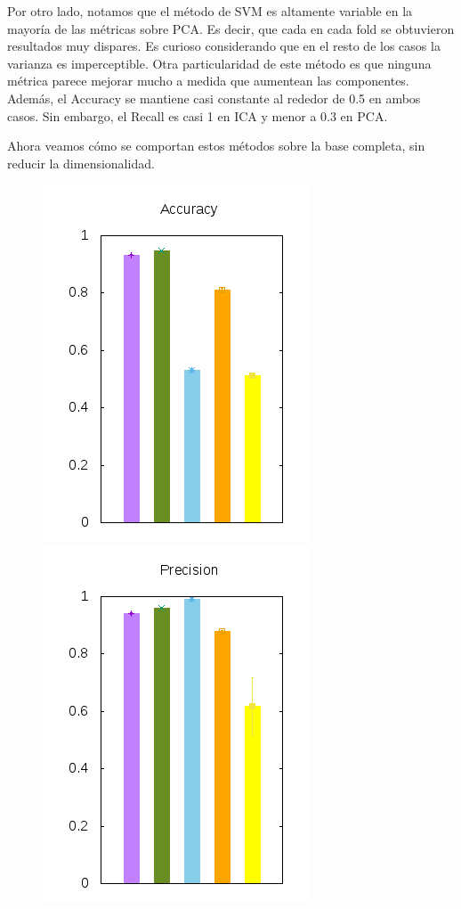 \documentclass[10pt, a4paper]{article}
\begin{document}
Por otro lado, notamos que el método de SVM es altamente variable en la mayoría de las métricas sobre PCA. Es decir, que cada en cada fold se obtuvieron resultados muy dispares. Es curioso considerando que en el resto de los casos la varianza es imperceptible. Otra particularidad de este método es que ninguna métrica parece mejorar mucho a medida que aumentean las componentes. Además, el Accuracy se mantiene casi constante al rededor de 0.5 en ambos casos. Sin embargo, el Recall es casi 1 en ICA y menor a 0.3 en PCA.

Ahora veamos cómo se comportan estos métodos sobre la base completa, sin reducir la dimensionalidad.

\begin{figure}[H]
  \begin{minipage}{1\textwidth}
	\includegraphics[scale=0.5]{../src/data/ac.png}
	\includegraphics[scale=0.5]{../src/data/pr.png}

\end{minipage}
\end{figure}
\end{document}
